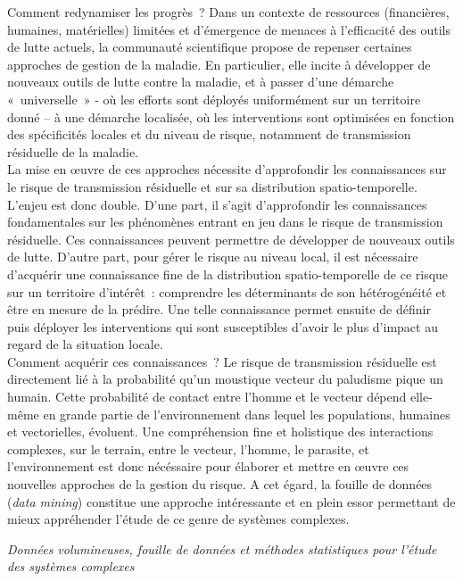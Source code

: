 \documentclass[12pt,twoside]{reedthesis}
\begin{document}
Comment redynamiser les progrès~? Dans un contexte de ressources (financières, humaines, matérielles) limitées et d'émergence de menaces à l'efficacité des outils de lutte actuels, la communauté scientifique propose de repenser certaines approches de gestion de la maladie. En particulier, elle incite à développer de nouveaux outils de lutte contre la maladie, et à passer d'une démarche «~universelle~» - où les efforts sont déployés uniformément sur un territoire donné -- à une démarche localisée, où les interventions sont optimisées en fonction des spécificités locales et du niveau de risque, notamment de transmission résiduelle de la maladie.\\

La mise en œuvre de ces approches nécessite d'approfondir les connaissances sur le risque de transmission résiduelle et sur sa distribution spatio-temporelle. L'enjeu est donc double. D'une part, il s'agit d'approfondir les connaissances fondamentales sur les phénomènes entrant en jeu dans le risque de transmission résiduelle. Ces connaissances peuvent permettre de développer de nouveaux outils de lutte. D'autre part, pour gérer le risque au niveau local, il est nécessaire d'acquérir une connaissance fine de la distribution spatio-temporelle de ce risque sur un territoire d'intérêt~: comprendre les déterminants de son hétérogénéité et être en mesure de la prédire. Une telle connaissance permet ensuite de définir puis déployer les interventions qui sont susceptibles d'avoir le plus d'impact au regard de la situation locale.\\

Comment acquérir ces connaissances~? Le risque de transmission résiduelle est directement lié à la probabilité qu'un moustique vecteur du paludisme pique un humain. Cette probabilité de contact entre l'homme et le vecteur dépend elle-même en grande partie de l'environnement dans lequel les populations, humaines et vectorielles, évoluent. Une compréhension fine et holistique des interactions complexes, sur le terrain, entre le vecteur, l'homme, le parasite, et l'environnement est donc nécéssaire pour élaborer et mettre en œuvre ces nouvelles approches de la gestion du risque. A cet égard, la fouille de données (\emph{data mining}) constitue une approche intéressante et en plein essor permettant de mieux appréhender l'étude de ce genre de systèmes complexes.

\pagebreak

\emph{Données volumineuses, fouille de données et méthodes statistiques pour l'étude des systèmes complexes}\\
\end{document}
